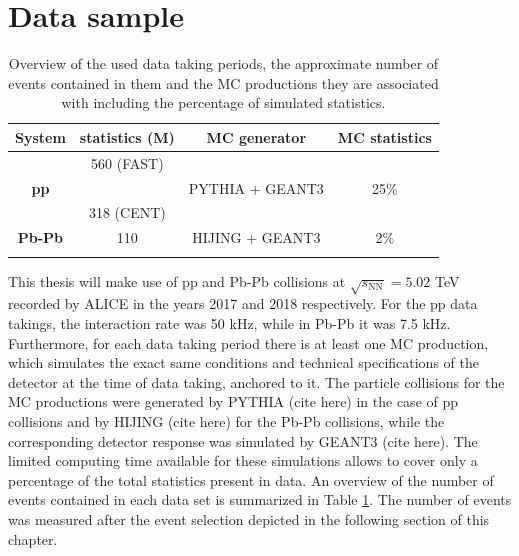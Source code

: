\documentclass[12pt,a4paper]{report}
\begin{document}
\section{Data sample}
\begin{table}[tb!]
\centering
\renewcommand{\arraystretch}{1.5}
\begin{tabular}{c|c|c|c}
\toprule
\rowcolor{headerBlue} \textbf{System} & \textbf{statistics}  \textbf{(M)} & \textbf{MC generator} &  \textbf{MC statistics } \\
\midrule
             & 560 (FAST) & & \\
\textbf{pp}	 &	 &   PYTHIA + GEANT3  & 25\%  	 \\
 &  318 (CENT)   &  	\\
\hline
\textbf{Pb-Pb} & 110 &  HIJING + GEANT3  & 2\% \\
				 &	   & 		 \\
\bottomrule
\end{tabular}
\caption{Overview of the used data taking periods, the approximate number of events contained in them and the MC productions they are associated with including the percentage of simulated statistics.}
\label{tab:Periods}
\end{table} 
This thesis will make use of pp and Pb-Pb collisions at $\sqrt{s_\text{NN}}= 5.02$ TeV recorded by ALICE in the years 2017 and 2018 respectively. For the pp data takings, the interaction rate was 50 kHz, while in Pb-Pb it was 7.5 kHz. Furthermore, for each data taking period there is at least one MC production, which simulates the exact same conditions and technical specifications of the detector at the time of data taking, anchored to it. The particle collisions for the MC productions were generated by PYTHIA (cite here) in the case of pp collisions and by HIJING (cite here) for the Pb-Pb collisions, while the corresponding detector response was simulated by GEANT3 (cite here). The limited computing time available for these simulations allows to cover only a percentage of the total statistics present in data. An overview of the number of events contained in each data set is summarized in Table \ref{tab:Periods}. The number of events was measured after the event selection depicted in the following section of this chapter.\\
\end{document}
